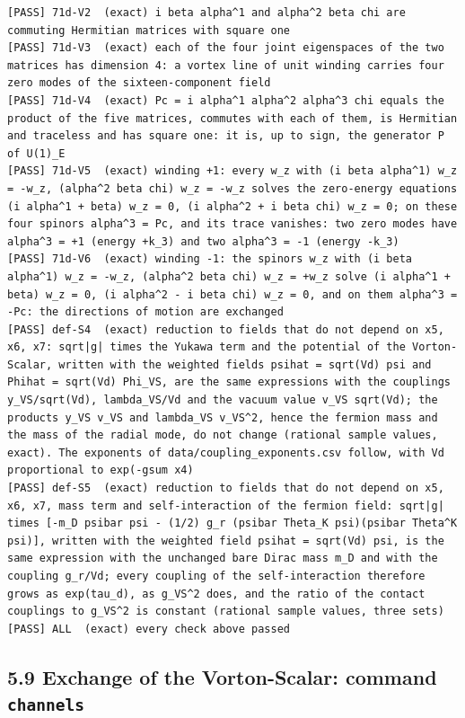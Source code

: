 \documentclass[
  10pt,
]{article}
\begin{document}
\begin{verbatim}
[PASS] 71d-V2  (exact) i beta alpha^1 and alpha^2 beta chi are commuting Hermitian matrices with square one
[PASS] 71d-V3  (exact) each of the four joint eigenspaces of the two matrices has dimension 4: a vortex line of unit winding carries four zero modes of the sixteen-component field
[PASS] 71d-V4  (exact) Pc = i alpha^1 alpha^2 alpha^3 chi equals the product of the five matrices, commutes with each of them, is Hermitian and traceless and has square one: it is, up to sign, the generator P of U(1)_E
[PASS] 71d-V5  (exact) winding +1: every w_z with (i beta alpha^1) w_z = -w_z, (alpha^2 beta chi) w_z = -w_z solves the zero-energy equations (i alpha^1 + beta) w_z = 0, (i alpha^2 + i beta chi) w_z = 0; on these four spinors alpha^3 = Pc, and its trace vanishes: two zero modes have alpha^3 = +1 (energy +k_3) and two alpha^3 = -1 (energy -k_3)
[PASS] 71d-V6  (exact) winding -1: the spinors w_z with (i beta alpha^1) w_z = -w_z, (alpha^2 beta chi) w_z = +w_z solve (i alpha^1 + beta) w_z = 0, (i alpha^2 - i beta chi) w_z = 0, and on them alpha^3 = -Pc: the directions of motion are exchanged
[PASS] def-S4  (exact) reduction to fields that do not depend on x5, x6, x7: sqrt|g| times the Yukawa term and the potential of the Vorton-Scalar, written with the weighted fields psihat = sqrt(Vd) psi and Phihat = sqrt(Vd) Phi_VS, are the same expressions with the couplings y_VS/sqrt(Vd), lambda_VS/Vd and the vacuum value v_VS sqrt(Vd); the products y_VS v_VS and lambda_VS v_VS^2, hence the fermion mass and the mass of the radial mode, do not change (rational sample values, exact). The exponents of data/coupling_exponents.csv follow, with Vd proportional to exp(-gsum x4)
[PASS] def-S5  (exact) reduction to fields that do not depend on x5, x6, x7, mass term and self-interaction of the fermion field: sqrt|g| times [-m_D psibar psi - (1/2) g_r (psibar Theta_K psi)(psibar Theta^K psi)], written with the weighted field psihat = sqrt(Vd) psi, is the same expression with the unchanged bare Dirac mass m_D and with the coupling g_r/Vd; every coupling of the self-interaction therefore grows as exp(tau_d), as g_VS^2 does, and the ratio of the contact couplings to g_VS^2 is constant (rational sample values, three sets)
[PASS] ALL  (exact) every check above passed
\end{verbatim}

\hypertarget{exchange-of-the-vorton-scalar-command-channels}{%
\subsection{\texorpdfstring{5.9 Exchange of the Vorton-Scalar: command
\texttt{channels}}{5.9 Exchange of the Vorton-Scalar: command channels}}\label{exchange-of-the-vorton-scalar-command-channels}}
\end{document}
